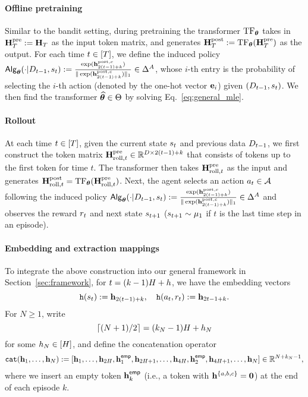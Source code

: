 \paragraph{Offline pretraining}
Similar to the bandit setting, during
pretraining the transformer ${\rm TF}_{{\boldsymbol \theta}}$ takes in   ${\mathbf H}_{T}^{\mathrm{pre}}:={\mathbf H}_{T}$ as the input token matrix, and generates ${\mathbf H}_{T}^{\mathrm{post}}:={\rm TF}_{{\boldsymbol \theta}}({\mathbf H}_{T}^{\mathrm{pre}})$ as the output. For each time $t\in[{T}]$, we define the  induced policy  ${\mathsf{Alg}}_{{\boldsymbol \theta}}(\cdot|{D}_{t-1},{s}_t):=\frac{\exp({\mathbf h}^{{\mathrm{post}},{c}}_{2(t-1)+k})}{\|\exp({\mathbf h}^{{\mathrm{post}},{c}}_{2(t-1)+k})\|_1}\in\Delta^{A}$, whose $i$-th entry is the probability of selecting the $i$-th action (denoted by the  one-hot vector ${\mathbf e}_i$) given $({D}_{t-1},{s}_t)$. We then find the transformer ${\widehat{{\boldsymbol \theta}}}\in{\Theta}$ by solving Eq.~\eqref{eq:general_mle}.

\paragraph{Rollout}
At each time $t\in[{T}]$, given the  current state ${s}_t$ and  previous data ${D}_{t-1}$, we first construct the token matrix ${\mathbf H}^{{\mathrm{pre}}}_{{\mathrm{roll}},t}\in\mathbb{R}^{D\times 2(t-1)+k}$ that consists of tokens up to the first token for time $t$.   The transformer then takes ${\mathbf H}^{{\mathrm{pre}}}_{{\mathrm{roll}},t}$ as the input  and generates ${\mathbf H}^{{\mathrm{post}}}_{{\mathrm{roll}},t}={\rm TF}_{{\boldsymbol \theta}}({\mathbf H}^{{\mathrm{pre}}}_{{\mathrm{roll}},t})$. Next,  the agent selects an action ${a}_t\in{\mathcal{A}}$ following  the induced  policy ${\mathsf{Alg}}_{{\boldsymbol \theta}}(\cdot|{D}_{t-1},{s}_t):=\frac{\exp({\mathbf h}^{{\mathrm{post}},{c}}_{2(t-1)+k})}{\|\exp({\mathbf h}^{{\mathrm{post}},{c}}_{2(t-1)+k})\|_1}\in\Delta^{A}$ and observes the reward ${r}_t$ and next state ${s}_{t+1}$ (${s}_{t+1}\sim{\mu_1}$ if $t$ is the last time step in an episode).





\paragraph{Embedding and extraction mappings}
To integrate the above construction into our general framework in Section~\ref{sec:framework}, for $t=(k-1){H}+h$,  we have the embedding vectors $${\tt h}({s}_t):={\mathbf h}_{2(t-1)+k},~~~{\tt h}({a}_t,{r}_t):={\mathbf h}_{2t-1+k}.$$  For $N\geq 1$, write $$\lceil(N+1)/2\rceil=(k_N-1){H}+h_N$$ for some $h_N\in[{H}]$, and define the  concatenation operator
\begin{align*}
{\tt cat}({\mathbf h}_1, \ldots, {\mathbf h}_N): = [{\mathbf h}_1, \ldots,{\mathbf h}_{2{H}},{\mathbf h}_{1}^{{\mathsf{emp}}}, {\mathbf h}_{2{H}+1},\ldots,{\mathbf h}_{4{H}},{\mathbf h}_2^{\mathsf{emp}},{\mathbf h}_{4{H}+1},\ldots, {\mathbf h}_N]\in\mathbb{R}^{N+k_N-1},
\end{align*}
where we insert an empty token ${\mathbf h}_k^{\mathsf{emp}}$ (i.e., a token with ${\mathbf h}^{\{{a},{b},{c}\}}={\mathbf 0}$) at the end of  each episode $k$.

